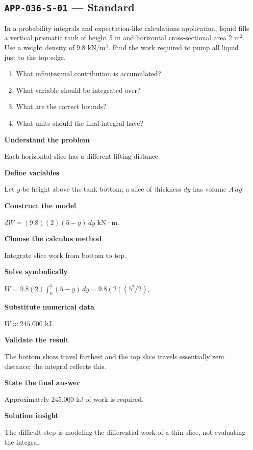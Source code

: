 \documentclass[11pt]{book}
\newcommand{\pid}[1]{\texttt{#1}}
\begin{document}
\subsection*{\pid{APP-036-S-01} — Standard}
\begin{problembox}
In a probability integrals and expectation-like calculations application, liquid fills a vertical prismatic tank of height 5 m and horizontal cross-sectional area 2 m$^2$. Use a weight density of 9.8 kN/m$^3$. Find the work required to pump all liquid just to the top edge.
\end{problembox}
\begin{promptbox}\begin{enumerate}
\item What infinitesimal contribution is accumulated?
\item What variable should be integrated over?
\item What are the correct bounds?
\item What units should the final integral have?
\end{enumerate}\end{promptbox}
\begin{solutionbox}
\textbf{Understand the problem}\par Each horizontal slice has a different lifting distance.\par\medskip
\textbf{Define variables}\par Let $y$ be height above the tank bottom; a slice of thickness $dy$ has volume $A\,dy$.\par\medskip
\textbf{Construct the model}\par $dW=(9.8)(2)(5-y)\,dy$ kN·m.\par\medskip
\textbf{Choose the calculus method}\par Integrate slice work from bottom to top.\par\medskip
\textbf{Solve symbolically}\par $W=9.8(2)\int_0^{5}(5-y)\,dy=9.8(2)(5^2/2)$.\par\medskip
\textbf{Substitute numerical data}\par $W\approx 245.000$ kJ.\par\medskip
\textbf{Validate the result}\par The bottom slices travel farthest and the top slice travels essentially zero distance; the integral reflects this.\par\medskip
\textbf{State the final answer}\par Approximately $245.000$ kJ of work is required.\par\medskip
\textbf{Solution insight}\par The difficult step is modeling the differential work of a thin slice, not evaluating the integral.\par\medskip
\end{solutionbox}
\end{document}
